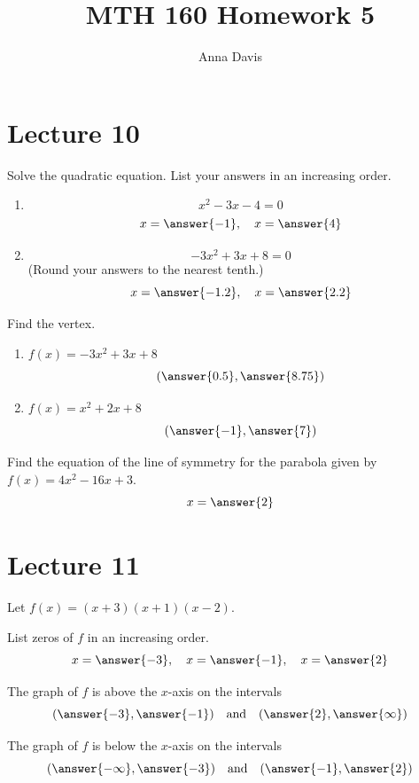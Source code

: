 \documentclass{ximera}
\author{Anna Davis} \title{MTH 160 Homework 5}
\begin{document}
\begin{abstract}

\end{abstract}
\maketitle
 \section{Lecture 10}
 
  \begin{problem}\label{prob:160hom5prob1} 
  Solve the quadratic equation.  List your answers in an increasing order.
  \begin{enumerate}
      \item $$x^2-3x-4=0$$
      $$x=\answer{-1},\quad x=\answer{4}$$
      \item $$-3x^2+3x+8=0$$ (Round your answers to the nearest tenth.)
      $$x=\answer{-1.2},\quad x=\answer{2.2}$$
  \end{enumerate}
  \end{problem}
  
  \begin{problem}\label{prob:160hom5prob2} 
  Find the vertex.
  \begin{enumerate}
      \item $f(x)=-3x^2+3x+8$
      $$(\answer{0.5},\answer{8.75})$$
      \item $f(x)=x^2+2x+8$
      $$(\answer{-1},\answer{7})$$
  \end{enumerate}
  \end{problem}
  
  \begin{problem}\label{prob:160hom5prob3} 
  Find the equation of the line of symmetry for the parabola given by $f(x)=4x^2-16x+3$.
  $$x=\answer{2}$$
  \end{problem}
  
  \section{Lecture 11}
  
  \begin{problem}\label{prob:160hom5prob5} 
  Let $f(x)=(x+3)(x+1)(x-2)$.  
  
  List zeros of $f$ in an increasing order.
  $$x=\answer{-3},\quad x=\answer{-1},\quad x=\answer{2}$$
  
  The graph of $f$ is above the $x$-axis on the intervals
  $$(\answer{-3},\answer{-1})\quad \mbox{and}\quad (\answer{2},\answer{\infty})$$
  
  The graph of $f$ is below the $x$-axis on the intervals
  $$(\answer{-\infty},\answer{-3})\quad \mbox{and}\quad (\answer{-1},\answer{2})$$
  \end{problem}
  
\end{document}
